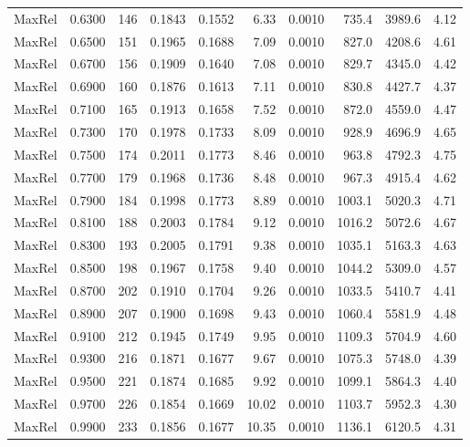{\begin{longtable}{lrrrrrrrrr}
  MaxRel & 0.6300 & 146 & 0.1843 & 0.1552 & 6.33 & 0.0010 & 735.4 & 3989.6 & 4.12 \\
  MaxRel & 0.6500 & 151 & 0.1965 & 0.1688 & 7.09 & 0.0010 & 827.0 & 4208.6 & 4.61 \\
  MaxRel & 0.6700 & 156 & 0.1909 & 0.1640 & 7.08 & 0.0010 & 829.7 & 4345.0 & 4.42 \\
  MaxRel & 0.6900 & 160 & 0.1876 & 0.1613 & 7.11 & 0.0010 & 830.8 & 4427.7 & 4.37 \\
  MaxRel & 0.7100 & 165 & 0.1913 & 0.1658 & 7.52 & 0.0010 & 872.0 & 4559.0 & 4.47 \\
  MaxRel & 0.7300 & 170 & 0.1978 & 0.1733 & 8.09 & 0.0010 & 928.9 & 4696.9 & 4.65 \\
  MaxRel & 0.7500 & 174 & 0.2011 & 0.1773 & 8.46 & 0.0010 & 963.8 & 4792.3 & 4.75 \\
  MaxRel & 0.7700 & 179 & 0.1968 & 0.1736 & 8.48 & 0.0010 & 967.3 & 4915.4 & 4.62 \\
  MaxRel & 0.7900 & 184 & 0.1998 & 0.1773 & 8.89 & 0.0010 & 1003.1 & 5020.3 & 4.71 \\
  MaxRel & 0.8100 & 188 & 0.2003 & 0.1784 & 9.12 & 0.0010 & 1016.2 & 5072.6 & 4.67 \\
  MaxRel & 0.8300 & 193 & 0.2005 & 0.1791 & 9.38 & 0.0010 & 1035.1 & 5163.3 & 4.63 \\
  MaxRel & 0.8500 & 198 & 0.1967 & 0.1758 & 9.40 & 0.0010 & 1044.2 & 5309.0 & 4.57 \\
  MaxRel & 0.8700 & 202 & 0.1910 & 0.1704 & 9.26 & 0.0010 & 1033.5 & 5410.7 & 4.41 \\
  MaxRel & 0.8900 & 207 & 0.1900 & 0.1698 & 9.43 & 0.0010 & 1060.4 & 5581.9 & 4.48 \\
  MaxRel & 0.9100 & 212 & 0.1945 & 0.1749 & 9.95 & 0.0010 & 1109.3 & 5704.9 & 4.60 \\
  MaxRel & 0.9300 & 216 & 0.1871 & 0.1677 & 9.67 & 0.0010 & 1075.3 & 5748.0 & 4.39 \\
  MaxRel & 0.9500 & 221 & 0.1874 & 0.1685 & 9.92 & 0.0010 & 1099.1 & 5864.3 & 4.40 \\
  MaxRel & 0.9700 & 226 & 0.1854 & 0.1669 & 10.02 & 0.0010 & 1103.7 & 5952.3 & 4.30 \\
  MaxRel & 0.9900 & 233 & 0.1856 & 0.1677 & 10.35 & 0.0010 & 1136.1 & 6120.5 & 4.31 \\
\end{longtable}
}
